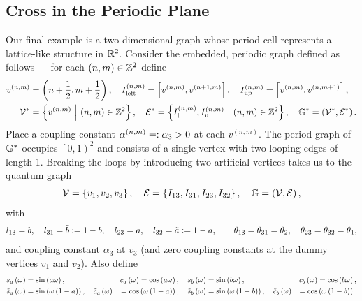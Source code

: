 \subsection{Cross in the Periodic Plane} \label{ssec:ExampleCrossInPlane}
Our final example is a two-dimensional graph whose period cell represents a lattice-like structure in $\mathbb{R}^2$.
Consider the embedded, periodic graph defined as follows --- for each $\left( n,m \right)\in\mathbb{Z}^2$ define
\begin{align*}
	v^{(n,m)} &= \left( n+\frac{1}{2}, m+\frac{1}{2} \right), \quad
	I_{\mathrm{left}}^{\left( n,m \right)} = \left[ v^{\left( n,m \right)}, v^{\left( n+1,m \right)} \right], \quad
	I_{\mathrm{up}}^{\left( n,m \right)} = \left[ v^{\left( n,m \right)}, v^{\left( n,m+1 \right)} \right], \\
	\mathcal{V}^* &= \left\{ v^{\left( n,m \right)} \ \middle\vert \  \left( n,m \right)\in\mathbb{Z}^2 \right\}, \quad
	\mathcal{E}^* = \left\{  I_{\mathrm{l}}^{\left( n,m \right)}, I_{\mathrm{u}}^{\left( n,m \right)} \ \middle\vert \  \left( n,m \right)\in\mathbb{Z}^2 \right\}, \quad
	\mathbb{G}^* = \left( \mathcal{V}^*, \mathcal{E}^* \right).
\end{align*}
Place a coupling constant $\alpha^{\left( n,m \right)} =: \alpha_3>0$ at each $v^{(n,m)}$.
The period graph of $\mathbb{G}^*$ occupies $\left[0,1\right)^2$ and consists of a single vertex with two looping edges of length 1.
Breaking the loops by introducing two artificial vertices takes us to the quantum graph
\begin{align*}
	\mathcal{V} = \left\{ v_1, v_2, v_3 \right\}, \quad
	\mathcal{E} = \left\{ I_{13}, I_{31}, I_{23}, I_{32} \right\}, \quad
	\mathbb{G} = \left( \mathcal{V}, \mathcal{E} \right),
\end{align*}
with
\begin{align*}
	l_{13} = b, \quad l_{31} = \tilde{b} := 1-b, \quad 
	l_{23} = a, \quad l_{32} = \tilde{a} := 1-a, \qquad
	\theta_{13} = \theta_{31} = \theta_2, \quad \theta_{23} = \theta_{32} = \theta_1,
\end{align*}
and coupling constant $\alpha_3$ at $v_3$ (and zero coupling constants at the dummy vertices $v_1$ and $v_2$).
Also define
\begin{alignat*}{4}
	 s_a\left( \omega \right) &= \sin\left( a\omega \right), \quad 
	 & c_a\left( \omega \right) = \cos\left( a\omega \right), \quad 
	 s_b\left( \omega \right) &= \sin\left( b\omega \right), \quad 
	 & c_b\left( \omega \right) = \cos\left( b\omega \right), \\
	 \tilde{s}_a\left( \omega \right) &= \sin\left( \omega\left( 1-a \right) \right), \quad 
	 \tilde{c}_a\left( \omega \right) &= \cos\left( \omega\left( 1-a \right) \right), \quad 
	 \tilde{s}_b\left( \omega \right) &= \sin\left( \omega\left( 1-b \right) \right), \quad 
	 \tilde{c}_b\left( \omega \right) &= \cos\left( \omega\left( 1-b \right) \right).
\end{alignat*}
